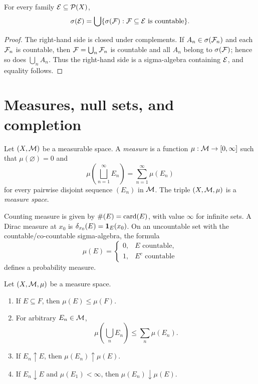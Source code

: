 \begin{prop}
For every family $\mathcal{E}\subseteq\mathcal{P}(X)$,
\[
\sigma(\mathcal{E})=\bigcup\{\sigma(\mathcal{F}):\mathcal{F}\subseteq\mathcal{E}\text{ is countable}\}.
\]
\end{prop}

\begin{proof}
The right-hand side is closed under complements. If $A_n\in\sigma(\mathcal{F}_n)$ and each $\mathcal{F}_n$ is countable, then $\mathcal{F}=\bigcup_n\mathcal{F}_n$ is countable and all $A_n$ belong to $\sigma(\mathcal{F})$; hence so does $\bigcup_nA_n$. Thus the right-hand side is a sigma-algebra containing $\mathcal{E}$, and equality follows.
\end{proof}

\section{Measures, null sets, and completion}

\begin{de}[Measure]
Let $(X,\mathcal{M})$ be a measurable space. A \emph{measure} is a function $\mu:\mathcal{M}\to[0,\infty]$ such that $\mu(\varnothing)=0$ and
\[
\mu\left(\bigsqcup_{n=1}^{\infty}E_n\right)
 =\sum_{n=1}^{\infty}\mu(E_n)
\]
for every pairwise disjoint sequence $(E_n)$ in $\mathcal{M}$. The triple $(X,\mathcal{M},\mu)$ is a \emph{measure space}.
\end{de}

\begin{eg}
Counting measure is given by $\#(E)=\operatorname{card}(E)$, with value $\infty$ for infinite sets. A Dirac measure at $x_0$ is $\delta_{x_0}(E)=\mathbf{1}_E(x_0)$. On an uncountable set with the countable/co-countable sigma-algebra, the formula
\[
\mu(E)=\begin{cases}
0,&E\text{ countable},\\
1,&E^c\text{ countable}
\end{cases}
\]
defines a probability measure.
\end{eg}

\begin{thm}
Let $(X,\mathcal{M},\mu)$ be a measure space.
\begin{enumerate}
  \item If $E\subseteq F$, then $\mu(E)\leq\mu(F)$.
  \item For arbitrary $E_n\in\mathcal{M}$,
  \[
  \mu\left(\bigcup_nE_n\right)\leq\sum_n\mu(E_n).
  \]
  \item If $E_n\uparrow E$, then $\mu(E_n)\uparrow\mu(E)$.
  \item If $E_n\downarrow E$ and $\mu(E_1)<\infty$, then $\mu(E_n)\downarrow\mu(E)$.
\end{enumerate}
\end{thm}

